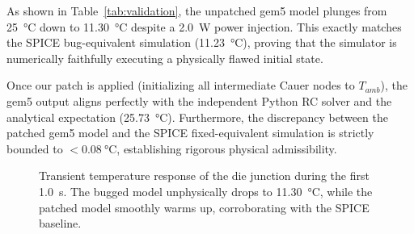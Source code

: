 As shown in Table~\ref{tab:validation}, the unpatched gem5 model plunges from \SI{25}{\degreeCelsius} down to \SI{11.30}{\degreeCelsius} despite a \SI{2.0}{\watt} power injection. This exactly matches the SPICE bug-equivalent simulation (\SI{11.23}{\degreeCelsius}), proving that the simulator is numerically faithfully executing a physically flawed initial state. 

Once our patch is applied (initializing all intermediate Cauer nodes to $T_{amb}$), the gem5 output aligns perfectly with the independent Python RC solver and the analytical expectation (\SI{25.73}{\degreeCelsius}). Furthermore, the discrepancy between the patched gem5 model and the SPICE fixed-equivalent simulation is strictly bounded to $< \SI{0.08}{\degreeCelsius}$, establishing rigorous physical admissibility.

\begin{figure}[t]
\centering
\caption{Transient temperature response of the die junction during the first \SI{1.0}{\second}. The bugged model unphysically drops to \SI{11.30}{\degreeCelsius}, while the patched model smoothly warms up, corroborating with the SPICE baseline.}
\label{fig:transient_comparison}
\end{figure}
